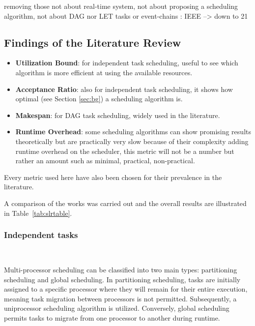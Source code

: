             removing those not about real-time system,
            not about proposing a scheduling algorithm,
            not about DAG nor LET tasks or event-chains : IEEE --> down to 21

\paragraph{}

\subsection{Findings of the Literature Review}

\begin{itemize}
    \item \textbf{Utilization Bound}: for independent task scheduling, useful to see which algorithm is more efficient at using the available resources.
    \item \textbf{Acceptance Ratio}: also for independent task scheduling, it shows how optimal (see Section \ref{sec:bg}) a scheduling algorithm is.
    \item \textbf{Makespan}: for DAG task scheduling, widely used in the literature.
    \item \textbf{Runtime Overhead}: some scheduling algorithms can show promising results theoretically but are practically very slow because 
    of their complexity adding runtime overhead on the scheduler, this metric will not be a number but rather an amount such as minimal, practical, non-practical.
\end{itemize}
Every metric used here have also been chosen for their prevalence in the literature.

A comparison of the works was carried out and the overall results are illustrated in Table~\ref{tab:slrtable}.

\subsubsection{Independent tasks}
~

Multi-processor scheduling can be classified into two main types: 
partitioning scheduling and global scheduling. In partitioning 
scheduling, tasks are initially assigned to a specific processor 
where they will remain for their entire execution, meaning task 
migration between processors is not permitted. Subsequently, a 
uniprocessor scheduling algorithm is utilized. Conversely, global 
scheduling permits tasks to migrate from one processor to another 
during runtime.

